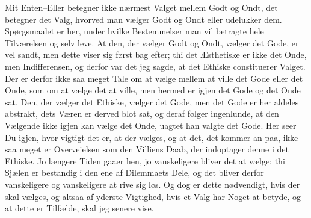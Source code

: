 \documentclass[12pt,a4paper]{article}
\begin{document}
Mit Enten–Eller betegner ikke nærmest Valget mellem Godt og Ondt, det betegner det Valg, hvorved man vælger Godt og Ondt eller udelukker dem. Spørgsmaalet er her, under hvilke Bestemmelser man vil betragte hele Tilværelsen og selv leve. At den, der vælger Godt og Ondt, vælger det Gode, er vel sandt, men dette viser sig først bag efter; thi det Æsthetiske er ikke det Onde, men Indifferensen, og derfor var det jeg sagde, at det Ethiske constituerer Valget. Der er derfor ikke saa meget Tale om at vælge mellem at ville det Gode eller det Onde, som om at vælge det at ville, men hermed er igjen det Gode og det Onde sat. Den, der vælger det Ethiske, vælger det Gode, men det Gode er her aldeles abstrakt, dets Væren er derved blot sat, og deraf følger ingenlunde, at den Vælgende ikke igjen kan vælge det Onde, uagtet han valgte det Gode. Her seer Du igjen, hvor vigtigt det er, at der vælges, og at det, det kommer an paa, ikke saa meget er Overveielsen som den Villiens Daab, der indoptager denne i det Ethiske. Jo længere Tiden gaaer hen, jo vanskeligere bliver det at vælge; thi Sjælen er bestandig i den ene af Dilemmaets Dele, og det bliver derfor vanskeligere og vanskeligere at rive sig løs. Og dog er dette nødvendigt, hvis der skal vælges, og altsaa af yderste Vigtighed, hvis et Valg har Noget at betyde, og at dette er Tilfælde, skal jeg senere vise.
\end{document}

